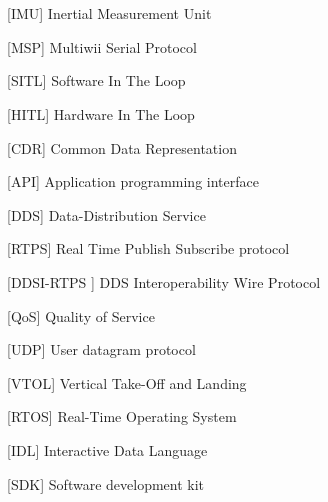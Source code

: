 \cleardoublepage
\chapter*{\listofabbrevname}
{}

\begin{acronym}[KolikMista]

		[IMU]
		{Inertial Measurement Unit}
		
	    [MSP]
	    {Multiwii Serial Protocol}
	    
		[SITL]
		{Software In The Loop}
		
		[HITL]
		{Hardware In The Loop}
		
		[CDR]
		{Common Data Representation}
		
		[API]
		{Application programming interface}

		[DDS\textsuperscript \textregistered ]
		{Data-Distribution Service\textsuperscript \textregistered}
		
		[RTPS]
		{Real Time Publish Subscribe protocol}
		
	    [DDSI-RTPS\textsuperscript{\texttrademark} ]
	    {DDS Interoperability Wire Protocol\textsuperscript{\texttrademark}}
		
		[QoS]
		{Quality of Service}
		
		[UDP]
		{User datagram protocol}
		
		[VTOL]
		{Vertical Take-Off and Landing}
		
		[RTOS]
		{Real-Time Operating System}
		
		[IDL]
		{Interactive Data Language}
		
		[SDK]
		{Software development kit}
		
\end{acronym}
